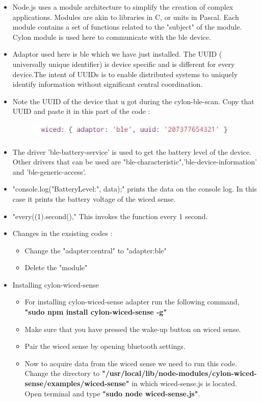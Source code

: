 \documentclass[11pt,a4paper]{article}
\begin{document}
\begin{itemize}
\begin{figure}[h]
	\end{figure}
     
     \item Node.js uses a module architecture to simplify the creation of complex applications. Modules are akin to libraries in C, or units in Pascal. Each module contains a set of functions related to the "subject" of the module. Cylon module is used here to communicate with the ble device.
     
     \item Adaptor used here is ble which we have just installed. The UUID ( universally unique identifier) is device specific and is different for every device.The intent of UUIDs is to enable distributed systems to uniquely identify information without significant central coordination.
     
     \item Note the UUID of the device that u got during the cylon-ble-scan. Copy that UUID and paste it in this part of the code :
     \begin{figure}[h]
    \centering
	\includegraphics[scale=0.65]{UUID.JPG}

	\end{figure}
     \item The driver 'ble-battery-service' is used to get the battery level of the device. Other drivers that can be used are "ble-characteristic",'ble-device-information' and 'ble-generic-access'.
     
     \item "console.log("BatteryLevel:", data);" prints the data on the console log. In this case it prints the battery voltage of the wiced sense.
     
     \item "every((1).second()," This invokes the function every 1 second.
	 \item Changes in the exsisting codes :
	  \begin{itemize}
	 \item Change the "adapter:central" to "adapter:ble"
	 \item Delete the "module"
	 \end{itemize}
	\newpage
	\item Installing cylon-wiced-sense
	 \begin{itemize}
	\item For installing cylon-wiced-sense adapter run the following command,\\
	\textbf{"sudo npm install cylon-wiced-sense -g"}
	\item Make sure that you have pressed the wake-up button on wiced sense.
	\item Pair the wiced sense by opening bluetooth settings.
	\item Now to acquire data from the wiced sense we need to run this code. Change the directory to \textbf{"/usr/local/lib/node-modules/cylon-wiced-sense/examples/wiced-sense"} in which wiced-sense.js is located.\\
	Open terminal and type \textbf{"sudo node wiced-sense.js"}.
	

\end{itemize}
\end{itemize}
\end{document}
